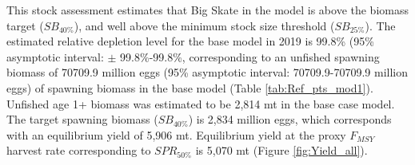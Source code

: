 \documentclass[12pt,]{article}
\begin{document}
This stock assessment estimates that Big Skate in the model is above the
biomass target (\(SB_{40\%}\)), and well above the minimum stock size
threshold (\(SB_{25\%}\)). The estimated relative depletion level for
the base model in 2019 is 99.8\% (95\% asymptotic interval: \(\pm\)
99.8\%-99.8\%, corresponding to an unfished spawning biomass of 70709.9
million eggs (95\% asymptotic interval: 70709.9-70709.9 million eggs) of
spawning biomass in the base model (Table \ref{tab:Ref_pts_mod1}).
Unfished age 1+ biomass was estimated to be 2,814 mt in the base case
model. The target spawning biomass (\(SB_{40\%}\)) is 2,834 million
eggs, which corresponds with an equilibrium yield of 5,906 mt.
Equilibrium yield at the proxy \(F_{MSY}\) harvest rate corresponding to
\(SPR_{50\%}\) is 5,070 mt (Figure \ref{fig:Yield_all}).

\FloatBarrier
\end{document}
